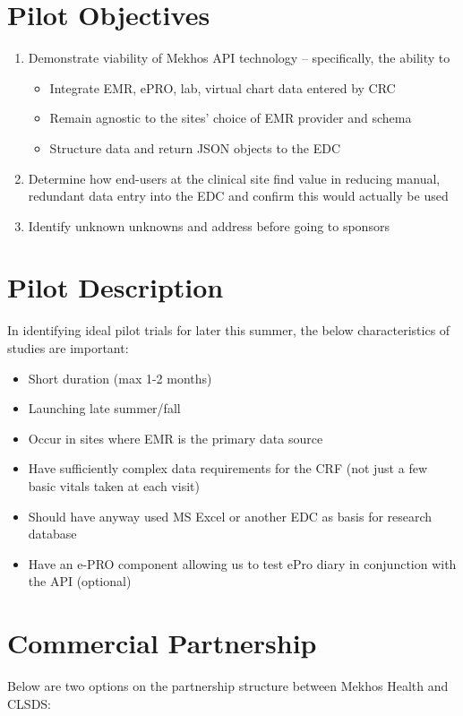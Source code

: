 \documentclass[12pt, oneside]{article}
\begin{document}
\section{Pilot Objectives}
\begin{enumerate}
\item Demonstrate viability of Mekhos API technology – specifically, the ability to
\begin{itemize}
\item Integrate EMR, ePRO, lab, virtual chart data entered by CRC 
\item Remain agnostic to the sites’ choice of EMR provider and schema
\item Structure data and return JSON objects to the EDC
\end{itemize}

\item Determine how end-users at the clinical site find value in reducing manual, redundant data entry into the EDC and confirm this would actually be used
\item Identify unknown unknowns and address before going to sponsors
\end{enumerate}

\section{Pilot Description}
\noindent 
In identifying ideal pilot trials for later this summer, the below characteristics of studies are important:

\begin{itemize}
\item Short duration (max 1-2 months)
\item Launching late summer/fall
\item Occur in sites where EMR is the primary data source
\item Have sufficiently complex data requirements for the CRF (not just a few basic vitals taken at each visit)
\item Should have anyway used MS Excel or another EDC as basis for research database
\item Have an e-PRO component allowing us to test ePro diary in conjunction with the API (optional)
\end{itemize}

\section{Commercial Partnership}
\noindent
Below are two options on the partnership structure between Mekhos Health and CLSDS:
\end{document}
